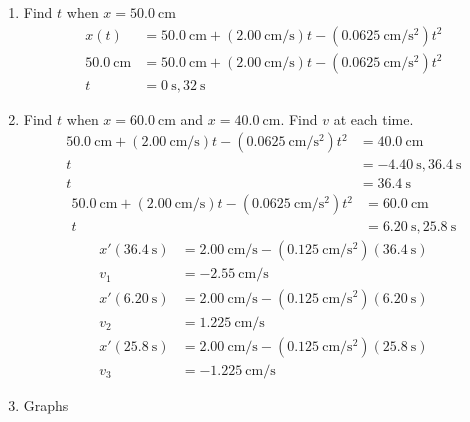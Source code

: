 \documentclass{article}
\begin{document}
\begin{enumerate}[label=\textbf{(\alph*)}]
	\item
		Find $ t $ when $ x = \SI{50.0}{\centi \meter} $
		\begin{align*}
			x(t) & = \SI{50.0}{\centi \meter} + (\SI{2.00}{\centi \meter \per \second})t - (\SI{0.0625}{\centi \meter \per \second \squared})t^2 \\
			\SI{50.0}{\centi \meter} & = \SI{50.0}{\centi \meter} + (\SI{2.00}{\centi \meter \per \second})t - (\SI{0.0625}{\centi \meter \per \second \squared})t^2 \\
			t & = \SI{0}{\second}, \SI{32}{\second}
		\end{align*}
	\item
		Find $ t $ when $ x = \SI{60.0}{\centi \meter} $ and $ x = \SI{40.0}{\centi \meter} $. Find $ v $ at each time.
		\begin{align*}
			\SI{50.0}{\centi \meter} + (\SI{2.00}{\centi \meter \per \second})t - (\SI{0.0625}{\centi \meter \per \second \squared})t^2 & = \SI{40.0}{\centi \meter} \\
			t & = \SI{-4.40}{\second}, \SI{36.4}{\second} \\
			t & = \SI{36.4}{\second}
		\end{align*}
		\begin{align*}
			\SI{50.0}{\centi \meter} + (\SI{2.00}{\centi \meter \per \second})t - (\SI{0.0625}{\centi \meter \per \second \squared})t^2 & = \SI{60.0}{\centi \meter} \\
			t & = \SI{6.20}{\second}, \SI{25.8}{\second}
		\end{align*}
		\begin{align*}
			x'(\SI{36.4}{\second}) & = \SI{2.00}{\centi \meter \per \second} - (\SI{0.125}{\centi \meter \per \second \squared})(\SI{36.4}{\second}) \\
			v_1 & = \SI{-2.55}{\centi \meter \per \second} \\
			x'(\SI{6.20}{\second}) & = \SI{2.00}{\centi \meter \per \second} - (\SI{0.125}{\centi \meter \per \second \squared})(\SI{6.20}{\second}) \\
			v_2 & = \SI{1.225}{\centi \meter \per \second} \\
			x'(\SI{25.8}{\second}) & = \SI{2.00}{\centi \meter \per \second} - (\SI{0.125}{\centi \meter \per \second \squared})(\SI{25.8}{\second}) \\
			v_3 & = \SI{-1.225}{\centi \meter \per \second}
		\end{align*}
	\item
		Graphs
\end{enumerate}
\end{document}
